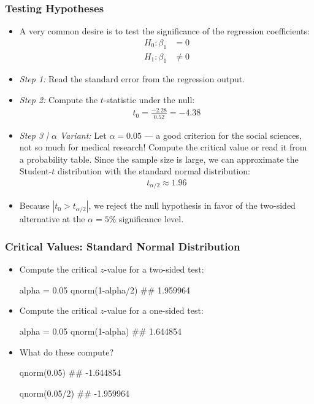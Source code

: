 \begin{frame}
\frametitle{Testing Hypotheses}
\begin{itemize}
\item A very common desire is to test the significance of the regression coefficients:
\begin{align*}
H_{0} \colon \beta_{1} & = 0\\
H_{1} \colon \beta_{1} & \ne 0
\end{align*}
\item \emph{Step 1:} Read the standard error from the regression output.
\item \emph{Step 2:} Compute the $t$-statistic under the null:
\begin{align*}
t_{0} 
  = \frac{-2.28}{0.52}
  = -4.38
\end{align*}
\item \emph{Step 3 | $\alpha$ Variant:} 
Let $\alpha=0.05$ --- a good criterion for the social sciences, not so much for medical research! Compute the critical value or read it from a probability table. Since the sample size is large, we can approximate the Student-$t$ distribution with the standard normal distribution:
\begin{align*}
t_{\alpha/2} \approx 1.96
\end{align*}
\item Because $|t_{0} > t_{\alpha/2}|$, we reject the null hypothesis in favor of the two-sided alternative at the $\alpha=5\%$ significance level.
\end{itemize}
\end{frame}


\begin{frame}[fragile,shrink=10]%
\frametitle{Critical Values: Standard Normal Distribution}
\begin{itemize}
\item Compute the critical $z$-value for a two-sided test:
\begin{Rcode}
alpha = 0.05
qnorm(1-alpha/2)
## 1.959964
\end{Rcode}
\item Compute the critical $z$-value for a one-sided test:
\begin{Rcode}
alpha = 0.05
qnorm(1-alpha)
## 1.644854
\end{Rcode}
\item What do these compute?
\begin{Rcode}
qnorm(0.05)
## -1.644854

qnorm(0.05/2)
## -1.959964
\end{Rcode}
\end{itemize}
\end{frame}


